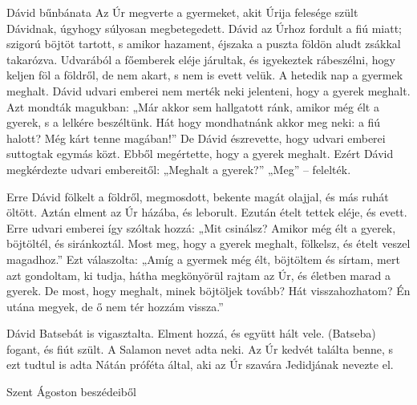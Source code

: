 \documentclass[twoside]{article}
\begin{document}
\begin{lectio}{Dávid bűnbánata}
Az Úr megverte a gyermeket, akit Úrija felesége szült Dávidnak, úgyhogy súlyosan megbetegedett.
Dávid az Úrhoz fordult a fiú miatt; szigorú böjtöt tartott, s amikor hazament, éjszaka a puszta
földön aludt zsákkal takarózva. Udvarából a főemberek eléje járultak, és igyekeztek rábeszélni, hogy
keljen föl a földről, de nem akart, s nem is evett velük. A hetedik nap a gyermek meghalt. Dávid
udvari emberei nem merték neki jelenteni, hogy a gyerek meghalt. Azt mondták magukban: „Már akkor
sem hallgatott ránk, amikor még élt a gyerek, s a lelkére beszéltünk. Hát hogy mondhatnánk akkor meg
neki: a fiú halott? Még kárt tenne magában!” De Dávid észrevette, hogy udvari emberei suttogtak
egymás közt. Ebből megértette, hogy a gyerek meghalt. Ezért Dávid megkérdezte udvari embereitől:
„Meghalt a gyerek?” „Meg” – felelték.

Erre Dávid fölkelt a földről, megmosdott, bekente magát olajjal, és más ruhát öltött. Aztán elment
az Úr házába, és leborult. Ezután ételt tettek eléje, és evett. Erre udvari emberei így szóltak
hozzá: „Mit csinálsz? Amikor még élt a gyerek, böjtöltél, és siránkoztál. Most meg, hogy a gyerek
meghalt, fölkelsz, és ételt veszel magadhoz.” Ezt válaszolta: „Amíg a gyermek még élt, böjtöltem és
sírtam, mert azt gondoltam, ki tudja, hátha megkönyörül rajtam az Úr, és életben marad a gyerek. De
most, hogy meghalt, minek böjtöljek tovább? Hát visszahozhatom? Én utána megyek, de ő nem tér hozzám
vissza.”

Dávid Batsebát is vigasztalta. Elment hozzá, és együtt hált vele. (Batseba) fogant, és fiút szült. A
Salamon nevet adta neki. Az Úr kedvét találta benne, s ezt tudtul is adta Nátán próféta által, aki
az Úr szavára Jedidjának nevezte el.
\end{lectio}



Szent Ágoston beszédeiből

{\centering{}}
\end{document}
